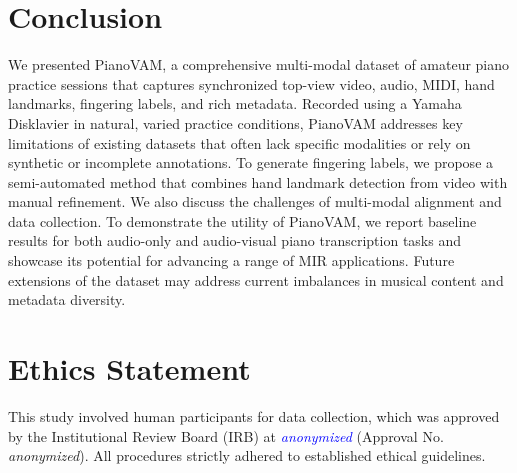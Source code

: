 \documentclass{article}
\newcommand{\alex}[1]{\textcolor{blue}{#1}}%
\begin{document}
\section{Conclusion}\label{sec:conclusion}
We presented PianoVAM, a comprehensive multi-modal dataset of amateur piano practice sessions that captures synchronized top-view video, audio, MIDI, hand landmarks, fingering labels, and rich metadata. Recorded using a Yamaha Disklavier in natural, varied practice conditions, PianoVAM addresses key limitations of existing datasets that often lack specific modalities or rely on synthetic or incomplete annotations. To generate fingering labels, we propose a semi-automated method that combines hand landmark detection from video with manual refinement. We also discuss the challenges of multi-modal alignment and data collection. To demonstrate the utility of PianoVAM, we report baseline results for both audio-only and audio-visual piano transcription tasks and showcase its potential for advancing a range of MIR applications. Future extensions of the dataset may address current imbalances in musical content and metadata diversity.



\section{Ethics Statement}
This study involved human participants for data collection, which was approved by the Institutional Review Board (IRB) at \alex{\textit{anonymized}} (Approval No. \textit{anonymized}). All procedures strictly adhered to established ethical guidelines.
\end{document}
